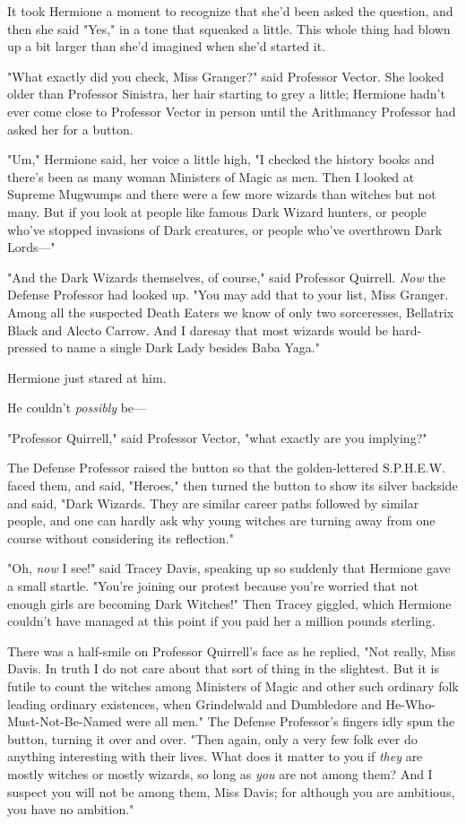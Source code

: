 It took Hermione a moment to recognize that she'd been asked the question, and
then she said "Yes," in a tone that squeaked a little. This whole thing had
blown up a bit larger than she'd imagined when she'd started it.

"What exactly did you check, Miss Granger?" said Professor Vector. She looked
older than Professor Sinistra, her hair starting to grey a little; Hermione
hadn't ever come close to Professor Vector in person until the Arithmancy
Professor had asked her for a button.

"Um," Hermione said, her voice a little high, "I checked the history books and
there's been as many woman Ministers of Magic as men. Then I looked at Supreme
Mugwumps and there were a few more wizards than witches but not many. But if
you look at people like famous Dark Wizard hunters, or people who've stopped
invasions of Dark creatures, or people who've overthrown Dark Lords\mbox{---}"

"And the Dark Wizards themselves, of course," said Professor Quirrell.
\emph{Now} the Defense Professor had looked up. "You may add that to your list,
Miss Granger. Among all the suspected Death Eaters we know of only two
sorceresses, Bellatrix Black and Alecto Carrow. And I daresay that most wizards
would be hard-pressed to name a single Dark Lady besides Baba Yaga."

Hermione just stared at him.

He couldn't \emph{possibly} be\mbox{---}

"Professor Quirrell," said Professor Vector, "what exactly are you implying?"

The Defense Professor raised the button so that the golden-lettered S.P.H.E.W.
faced them, and said, "Heroes," then turned the button to show its silver
backside and said, "Dark Wizards. They are similar career paths followed by
similar people, and one can hardly ask why young witches are turning away from
one course without considering its reflection."

"Oh, \emph{now} I see!" said Tracey Davis, speaking up so suddenly that
Hermione gave a small startle. "You're joining our protest because you're
worried that not enough girls are becoming Dark Witches!" Then Tracey giggled,
which Hermione couldn't have managed at this point if you paid her a million
pounds sterling.

There was a half-smile on Professor Quirrell's face as he replied, "Not really,
Miss Davis. In truth I do not care about that sort of thing in the slightest.
But it is futile to count the witches among Ministers of Magic and other such
ordinary folk leading ordinary existences, when Grindelwald and Dumbledore and
He-Who-Must-Not-Be-Named were all men." The Defense Professor's fingers idly
spun the button, turning it over and over. "Then again, only a very few folk
ever do anything interesting with their lives. What does it matter to you if
\emph{they} are mostly witches or mostly wizards, so long as \emph{you} are not
among them? And I suspect you will not be among them, Miss Davis; for although
you are ambitious, you have no ambition."

